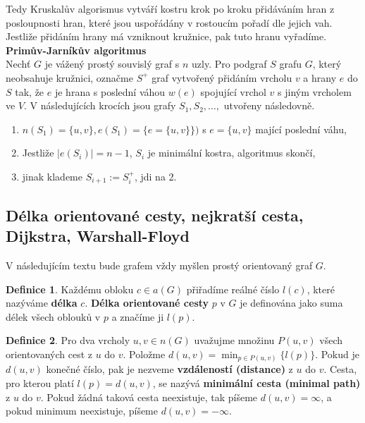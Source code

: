 \documentclass[a4]{report}
\theoremstyle{definition}
\newtheorem{definition}{Definice}[section]
\begin{document}
Tedy Kruskalův algorismus vytváří kostru krok po kroku přidáváním hran z posloupnosti hran, které jsou uspořádány v rostoucím pořadí dle jejich vah. Jestliže přidáním hrany má vzniknout kružnice, pak tuto hranu vyřadíme.
\\

\textbf{Primův-Jarníkův algoritmus}\\
Nechť $G$ je vážený prostý souvislý graf s $n$ uzly. Pro podgraf $S$ grafu $G$, který neobsahuje kružnici, označme $S^+$ graf vytvořený přidáním vrcholu $v$ a hrany $e$ do $S$ tak, že $e$ je hrana s poslední váhou $w(e)$ spojující vrchol $v$ s jiným vrcholem ve $V$. V následujících krocích jsou grafy $S_1, S_2, \ldots, $ utvořeny následovně.
\begin{enumerate}
    \item $n(S_1)=\{u,v\},e(S_1)=\{e=\{u,v\}\})$ s $e=\{u,v\}$ mající poslední váhu,
    \item Jestliže $|e(S_i)|=n-1$, $S_i$ je minimální kostra, algoritmus skončí,
    \item jinak klademe $S_{i+1}:=S^{+}_{i}$, jdi na 2.
\end{enumerate}

\subsection{Délka orientované cesty, nejkratší cesta, Dijkstra, Warshall-Floyd}

V následujícím textu bude grafem vždy myšlen prostý orientovaný graf $G$. 

\begin{definition}
Každému obloku $c \in a(G)$ přiřadíme reálné číslo $l(c)$, které nazýváme \textbf{délka} $c$. \textbf{Délka orientované cesty} $p$ v $G$ je definována jako suma délek všech oblouků v $p$ a značíme ji $l(p)$.
\end{definition}

\begin{definition}
Pro dva vrcholy $u,v \in n(G)$ uvažujme množinu $P(u,v)$ všech orientovaných  cest z $u$ do $v$. Položme $d(u,v) = \min_{p \in P(u,v)} \{ l(p)\}$. Pokud je $d(u,v)$ konečné číslo, pak je nezveme \textbf{vzdáleností (distance)} z $u$ do $v$. Cesta, pro kterou platí $l(p) = d(u,v)$, se nazývá \textbf{minimální cesta (minimal path)} z $u$ do $v$. Pokud žádná taková cesta neexistuje, tak píšeme $d(u,v) = \infty$, a pokud minimum neexistuje, píšeme $d(u,v) = -\infty$.
\end{definition}
\end{document}
